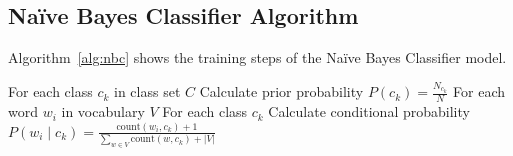 \subsection{Na\"ive Bayes Classifier Algorithm}

Algorithm~\ref{alg:nbc} shows the training steps of the Na\"ive Bayes Classifier model.

\begin{algorithm}[H]
\caption{Na\"ive Bayes Classifier Training}
\label{alg:nbc}
For each class $c_k$ in class set $C$\;
  Calculate prior probability $P(c_k) = \frac{N_{c_k}}{N}$\;
For each word $w_i$ in vocabulary $V$\;
  For each class $c_k$\;
    Calculate conditional probability $P(w_i \mid c_k) = \frac{\text{count}(w_i, c_k) + 1}{\sum_{w \in V} \text{count}(w, c_k) + |V|}$\;
\end{algorithm}
